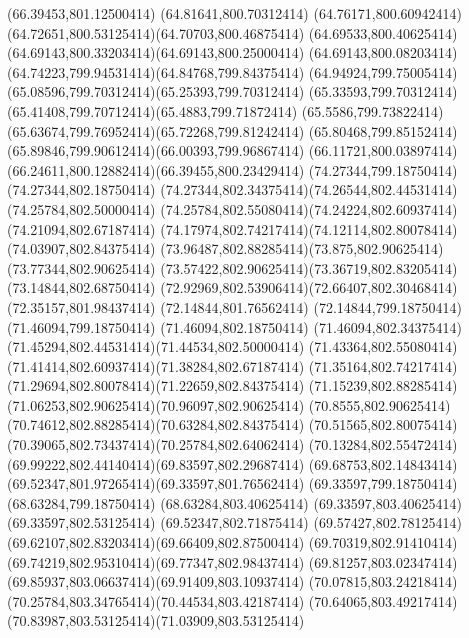 {{	\closepath
	\moveto(66.39453,801.12500414)
	\lineto(64.81641,800.70312414)
	\curveto(64.76171,800.60942414)(64.72651,800.53125414)(64.70703,800.46875414)
	\curveto(64.69533,800.40625414)(64.69143,800.33203414)(64.69143,800.25000414)
	\curveto(64.69143,800.08203414)(64.74223,799.94531414)(64.84768,799.84375414)
	\curveto(64.94924,799.75005414)(65.08596,799.70312414)(65.25393,799.70312414)
	\curveto(65.33593,799.70312414)(65.41408,799.70712414)(65.4883,799.71872414)
	\curveto(65.5586,799.73822414)(65.63674,799.76952414)(65.72268,799.81242414)
	\curveto(65.80468,799.85152414)(65.89846,799.90612414)(66.00393,799.96867414)
	\curveto(66.11721,800.03897414)(66.24611,800.12882414)(66.39455,800.23429414)
	\closepath
	\moveto(74.27344,799.18750414)
	\lineto(74.27344,802.18750414)
	\curveto(74.27344,802.34375414)(74.26544,802.44531414)(74.25784,802.50000414)
	\curveto(74.25784,802.55080414)(74.24224,802.60937414)(74.21094,802.67187414)
	\curveto(74.17974,802.74217414)(74.12114,802.80078414)(74.03907,802.84375414)
	\curveto(73.96487,802.88285414)(73.875,802.90625414)(73.77344,802.90625414)
	\curveto(73.57422,802.90625414)(73.36719,802.83205414)(73.14844,802.68750414)
	\curveto(72.92969,802.53906414)(72.66407,802.30468414)(72.35157,801.98437414)
	\lineto(72.14844,801.76562414)
	\lineto(72.14844,799.18750414)
	\lineto(71.46094,799.18750414)
	\lineto(71.46094,802.18750414)
	\curveto(71.46094,802.34375414)(71.45294,802.44531414)(71.44534,802.50000414)
	\curveto(71.43364,802.55080414)(71.41414,802.60937414)(71.38284,802.67187414)
	\curveto(71.35164,802.74217414)(71.29694,802.80078414)(71.22659,802.84375414)
	\curveto(71.15239,802.88285414)(71.06253,802.90625414)(70.96097,802.90625414)
	\curveto(70.8555,802.90625414)(70.74612,802.88285414)(70.63284,802.84375414)
	\curveto(70.51565,802.80075414)(70.39065,802.73437414)(70.25784,802.64062414)
	\curveto(70.13284,802.55472414)(69.99222,802.44140414)(69.83597,802.29687414)
	\curveto(69.68753,802.14843414)(69.52347,801.97265414)(69.33597,801.76562414)
	\lineto(69.33597,799.18750414)
	\lineto(68.63284,799.18750414)
	\lineto(68.63284,803.40625414)
	\lineto(69.33597,803.40625414)
	\lineto(69.33597,802.53125414)
	\lineto(69.52347,802.71875414)
	\curveto(69.57427,802.78125414)(69.62107,802.83203414)(69.66409,802.87500414)
	\curveto(69.70319,802.91410414)(69.74219,802.95310414)(69.77347,802.98437414)
	\curveto(69.81257,803.02347414)(69.85937,803.06637414)(69.91409,803.10937414)
	\curveto(70.07815,803.24218414)(70.25784,803.34765414)(70.44534,803.42187414)
	\curveto(70.64065,803.49217414)(70.83987,803.53125414)(71.03909,803.53125414)
}}
